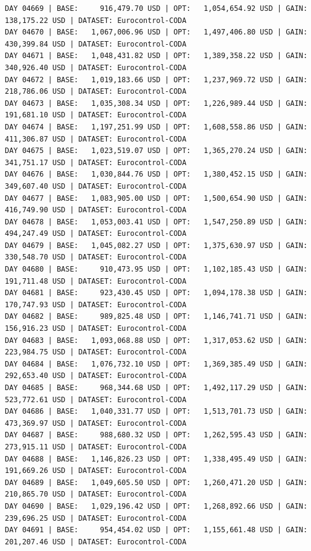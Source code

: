 \documentclass[11pt,a4paper]{article}
\begin{document}
\begin{verbatim}
DAY 04669 | BASE:     916,479.70 USD | OPT:   1,054,654.92 USD | GAIN: 138,175.22 USD | DATASET: Eurocontrol-CODA
DAY 04670 | BASE:   1,067,006.96 USD | OPT:   1,497,406.80 USD | GAIN: 430,399.84 USD | DATASET: Eurocontrol-CODA
DAY 04671 | BASE:   1,048,431.82 USD | OPT:   1,389,358.22 USD | GAIN: 340,926.40 USD | DATASET: Eurocontrol-CODA
DAY 04672 | BASE:   1,019,183.66 USD | OPT:   1,237,969.72 USD | GAIN: 218,786.06 USD | DATASET: Eurocontrol-CODA
DAY 04673 | BASE:   1,035,308.34 USD | OPT:   1,226,989.44 USD | GAIN: 191,681.10 USD | DATASET: Eurocontrol-CODA
DAY 04674 | BASE:   1,197,251.99 USD | OPT:   1,608,558.86 USD | GAIN: 411,306.87 USD | DATASET: Eurocontrol-CODA
DAY 04675 | BASE:   1,023,519.07 USD | OPT:   1,365,270.24 USD | GAIN: 341,751.17 USD | DATASET: Eurocontrol-CODA
DAY 04676 | BASE:   1,030,844.76 USD | OPT:   1,380,452.15 USD | GAIN: 349,607.40 USD | DATASET: Eurocontrol-CODA
DAY 04677 | BASE:   1,083,905.00 USD | OPT:   1,500,654.90 USD | GAIN: 416,749.90 USD | DATASET: Eurocontrol-CODA
DAY 04678 | BASE:   1,053,003.41 USD | OPT:   1,547,250.89 USD | GAIN: 494,247.49 USD | DATASET: Eurocontrol-CODA
DAY 04679 | BASE:   1,045,082.27 USD | OPT:   1,375,630.97 USD | GAIN: 330,548.70 USD | DATASET: Eurocontrol-CODA
DAY 04680 | BASE:     910,473.95 USD | OPT:   1,102,185.43 USD | GAIN: 191,711.48 USD | DATASET: Eurocontrol-CODA
DAY 04681 | BASE:     923,430.45 USD | OPT:   1,094,178.38 USD | GAIN: 170,747.93 USD | DATASET: Eurocontrol-CODA
DAY 04682 | BASE:     989,825.48 USD | OPT:   1,146,741.71 USD | GAIN: 156,916.23 USD | DATASET: Eurocontrol-CODA
DAY 04683 | BASE:   1,093,068.88 USD | OPT:   1,317,053.62 USD | GAIN: 223,984.75 USD | DATASET: Eurocontrol-CODA
DAY 04684 | BASE:   1,076,732.10 USD | OPT:   1,369,385.49 USD | GAIN: 292,653.40 USD | DATASET: Eurocontrol-CODA
DAY 04685 | BASE:     968,344.68 USD | OPT:   1,492,117.29 USD | GAIN: 523,772.61 USD | DATASET: Eurocontrol-CODA
DAY 04686 | BASE:   1,040,331.77 USD | OPT:   1,513,701.73 USD | GAIN: 473,369.97 USD | DATASET: Eurocontrol-CODA
DAY 04687 | BASE:     988,680.32 USD | OPT:   1,262,595.43 USD | GAIN: 273,915.11 USD | DATASET: Eurocontrol-CODA
DAY 04688 | BASE:   1,146,826.23 USD | OPT:   1,338,495.49 USD | GAIN: 191,669.26 USD | DATASET: Eurocontrol-CODA
DAY 04689 | BASE:   1,049,605.50 USD | OPT:   1,260,471.20 USD | GAIN: 210,865.70 USD | DATASET: Eurocontrol-CODA
DAY 04690 | BASE:   1,029,196.42 USD | OPT:   1,268,892.66 USD | GAIN: 239,696.25 USD | DATASET: Eurocontrol-CODA
DAY 04691 | BASE:     954,454.02 USD | OPT:   1,155,661.48 USD | GAIN: 201,207.46 USD | DATASET: Eurocontrol-CODA

\end{verbatim}
\end{document}
